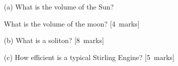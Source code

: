 %

\begin{itemize}

\item[(a)] What is the volume of the Sun?
\vspace{-0.1cm}
\begin{center}
\end{center}
\vspace{-0.1cm} 

What is the volume of the moon? [4~marks]

\item[(b)] What is a soliton? [8~marks]

\item[(c)] How efficient is a typical Stirling Engine? [5~marks]

\end{itemize}

%
